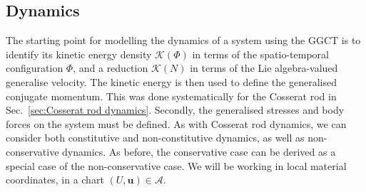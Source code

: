 \subsection{Dynamics} \label{sec:(summary) dynamics}

The starting point for modelling the dynamics of a system using the GGCT is to identify its kinetic energy density $\mathcal{K}(\Phi)$ in terms of the spatio-temporal configuration $\Phi$, and a reduction $\mathcal{K}(N)$ in terms of the Lie algebra-valued generalise velocity. The kinetic energy is then used to define the generalised conjugate momentum. This was done systematically for the Cosserat rod in Sec.~\ref{sec:Cosserat rod dynamics}. Secondly, the generalised stresses and body forces on the system must be defined. As with Cosserat rod dynamics, we can consider both constitutive and non-constitutive dynamics, as well as non-conservative dynamics. As before, the conservative case can be derived as a special case of the non-conservative case. We will be working in local material coordinates, in a chart $(U, \mathbf{u}) \in \mathcal{A}$.


